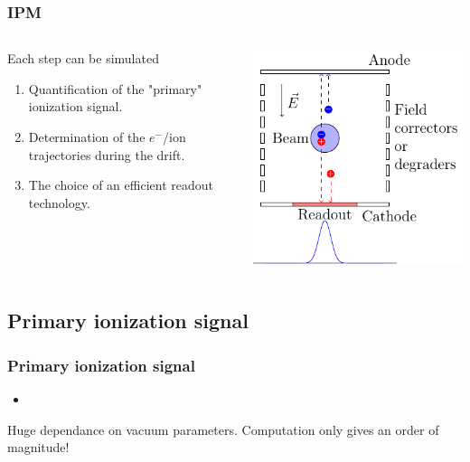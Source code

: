 \begin{frame}
  \frametitle{IPM}
  \begin{columns}
    \begin{column}{0.45\textwidth}
      \begin{block}{Each step can be simulated}
        \begin{enumerate}
          \item Quantification of the "primary" ionization signal.
          \item Determination of the $e^-$/ion trajectories during the drift.
          \item The choice of an efficient readout technology.
        \end{enumerate}
      \end{block}
    \end{column}
    \begin{column}{0.45\textwidth}
      \includegraphics[width=\textwidth]{02_ESS/fig/fig000_IPM.pdf}
    \end{column}
  \end{columns}
\end{frame}

\subsection{Primary ionization signal}
\begin{frame}
  \frametitle{Primary ionization signal}
  \begin{block}{}
    \begin{itemize}
      \item
    \end{itemize}
  \end{block}
  \begin{alertblock}{}
    Huge dependance on vacuum parameters. Computation only gives an order of magnitude!
  \end{alertblock}
\end{frame}

